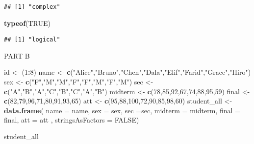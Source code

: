 \documentclass[
]{article}
\newenvironment{Shaded}{\begin{snugshade}}{\end{snugshade}}
\newcommand{\AttributeTok}[1]{\textcolor[rgb]{0.13,0.29,0.53}{#1}}
\newcommand{\ConstantTok}[1]{\textcolor[rgb]{0.56,0.35,0.01}{#1}}
\newcommand{\DecValTok}[1]{\textcolor[rgb]{0.00,0.00,0.81}{#1}}
\newcommand{\FunctionTok}[1]{\textcolor[rgb]{0.13,0.29,0.53}{\textbf{#1}}}
\newcommand{\NormalTok}[1]{#1}
\newcommand{\OtherTok}[1]{\textcolor[rgb]{0.56,0.35,0.01}{#1}}
\newcommand{\SpecialCharTok}[1]{\textcolor[rgb]{0.81,0.36,0.00}{\textbf{#1}}}
\newcommand{\StringTok}[1]{\textcolor[rgb]{0.31,0.60,0.02}{#1}}
\begin{document}
\begin{verbatim}
## [1] "complex"
\end{verbatim}

\begin{Shaded}
\begin{Highlighting}[]
\FunctionTok{typeof}\NormalTok{(}\ConstantTok{TRUE}\NormalTok{)}
\end{Highlighting}
\end{Shaded}

\begin{verbatim}
## [1] "logical"
\end{verbatim}

PART B

\begin{Shaded}
\begin{Highlighting}[]
\NormalTok{id }\OtherTok{\textless{}{-}}\NormalTok{ (}\DecValTok{1}\SpecialCharTok{:}\DecValTok{8}\NormalTok{)}
\NormalTok{name }\OtherTok{\textless{}{-}} \FunctionTok{c}\NormalTok{(}\StringTok{"Alice"}\NormalTok{,}\StringTok{"Bruno"}\NormalTok{,}\StringTok{"Chen"}\NormalTok{,}\StringTok{"Dala"}\NormalTok{,}\StringTok{"Elif"}\NormalTok{,}\StringTok{"Farid"}\NormalTok{,}\StringTok{"Grace"}\NormalTok{,}\StringTok{"Hiro"}\NormalTok{)}
\NormalTok{sex }\OtherTok{\textless{}{-}} \FunctionTok{c}\NormalTok{(}\StringTok{"F"}\NormalTok{,}\StringTok{"M"}\NormalTok{,}\StringTok{"M"}\NormalTok{,}\StringTok{"F"}\NormalTok{,}\StringTok{"F"}\NormalTok{,}\StringTok{"M"}\NormalTok{,}\StringTok{"F"}\NormalTok{,}\StringTok{"M"}\NormalTok{)}
\NormalTok{sec }\OtherTok{\textless{}{-}} \FunctionTok{c}\NormalTok{(}\StringTok{"A"}\NormalTok{,}\StringTok{"B"}\NormalTok{,}\StringTok{"A"}\NormalTok{,}\StringTok{"C"}\NormalTok{,}\StringTok{"B"}\NormalTok{,}\StringTok{"C"}\NormalTok{,}\StringTok{"A"}\NormalTok{,}\StringTok{"B"}\NormalTok{)}
\NormalTok{midterm }\OtherTok{\textless{}{-}} \FunctionTok{c}\NormalTok{(}\DecValTok{78}\NormalTok{,}\DecValTok{85}\NormalTok{,}\DecValTok{92}\NormalTok{,}\DecValTok{67}\NormalTok{,}\DecValTok{74}\NormalTok{,}\DecValTok{88}\NormalTok{,}\DecValTok{95}\NormalTok{,}\DecValTok{59}\NormalTok{)}
\NormalTok{final }\OtherTok{\textless{}{-}} \FunctionTok{c}\NormalTok{(}\DecValTok{82}\NormalTok{,}\DecValTok{79}\NormalTok{,}\DecValTok{96}\NormalTok{,}\DecValTok{71}\NormalTok{,}\DecValTok{80}\NormalTok{,}\DecValTok{91}\NormalTok{,}\DecValTok{93}\NormalTok{,}\DecValTok{65}\NormalTok{)}
\NormalTok{att }\OtherTok{\textless{}{-}} \FunctionTok{c}\NormalTok{(}\DecValTok{95}\NormalTok{,}\DecValTok{88}\NormalTok{,}\DecValTok{100}\NormalTok{,}\DecValTok{72}\NormalTok{,}\DecValTok{90}\NormalTok{,}\DecValTok{85}\NormalTok{,}\DecValTok{98}\NormalTok{,}\DecValTok{60}\NormalTok{)}
\NormalTok{  student\_all }\OtherTok{\textless{}{-}}\FunctionTok{data.frame}\NormalTok{(}
    \AttributeTok{name =}\NormalTok{ name,}
    \AttributeTok{sex =}\NormalTok{ sex,}
    \AttributeTok{sec =}\NormalTok{sec,}
    \AttributeTok{midterm =}\NormalTok{ midterm,}
    \AttributeTok{final =}\NormalTok{ final, }
    \AttributeTok{att =}\NormalTok{ att , }\AttributeTok{stringsAsFactors =} \ConstantTok{FALSE}\NormalTok{)}
  
\NormalTok{student\_all}
\end{Highlighting}
\end{Shaded}
\end{document}
